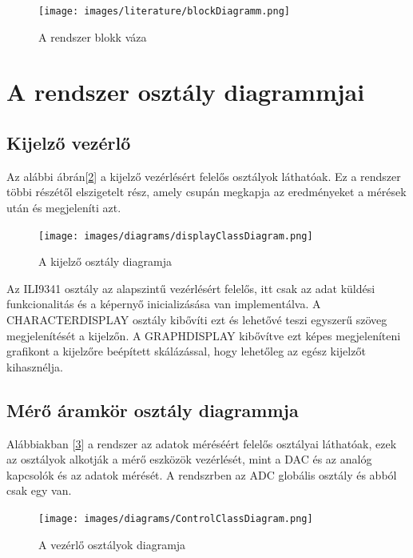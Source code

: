 \begin{figure}[h]
    \centering
    \texttt{[image: images/literature/blockDiagramm.png]}
    \caption{A rendszer blokk váza}
    \label{fig:blockDiagramm}
\end{figure}

\section{A rendszer osztály diagrammjai}

\subsection{Kijelző vezérlő}

Az alábbi ábrán[\ref{fig:displayClassDiagram}] a kijelző vezérlésért felelős osztályok láthatóak.
Ez a rendszer többi részétől elszigetelt rész, amely csupán 
megkapja az eredményeket a mérések után és megjeleníti azt.


\begin{figure}[h]
    \centering
    \texttt{[image: images/diagrams/displayClassDiagram.png]}
    \caption{A kijelző osztály diagramja}
    \label{fig:displayClassDiagram}
\end{figure}

Az ILI9341 osztály az alapszintű vezérlésért felelős, itt csak az 
adat küldési funkcionalitás és a képernyő inicializásása van
implementálva. A CHARACTERDISPLAY osztály kibővíti ezt és lehetővé
teszi egyszerű szöveg megjelenítését a kijelzőn.
A GRAPHDISPLAY kibővítve ezt képes megjeleníteni grafikont
a kijelzőre beépített skálázással, hogy lehetőleg az egész kijelzőt kihasznélja.


\subsection{Mérő áramkör osztály diagrammja}

Alábbiakban [\ref{fig:ControlClassDiagram}] a rendszer az adatok méréséért felelős osztályai láthatóak,
ezek az osztályok alkotják a mérő eszközök vezérlését, mint a 
DAC és az analóg kapcsolók és az adatok mérését.
A rendszrben az ADC globális osztály és abból csak egy van.

\begin{figure}[H]
    \centering
    \texttt{[image: images/diagrams/ControlClassDiagram.png]}
    \caption{A vezérlő osztályok diagramja}
    \label{fig:ControlClassDiagram}
\end{figure}


